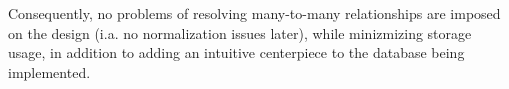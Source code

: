 \documentclass[a4paper]{article}
\begin{document}
Consequently, no problems of resolving many-to-many relationships are imposed on the design (i.a. no normalization issues later), while minizmizing storage usage, in addition to adding an intuitive centerpiece to the database being implemented.  
 
\end{document}
